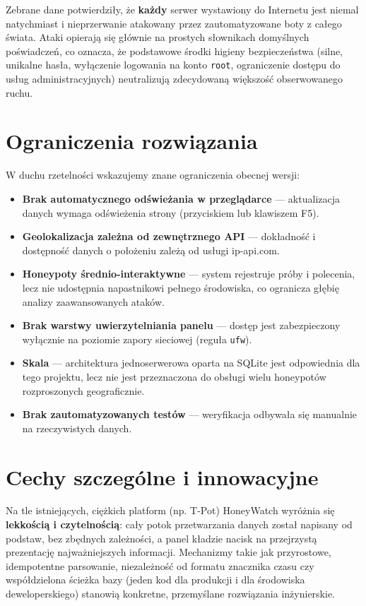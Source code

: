 \documentclass[12pt,a4paper]{report}
\begin{document}
Zebrane dane potwierdziły, że \textbf{każdy} serwer wystawiony do Internetu jest
niemal natychmiast i nieprzerwanie atakowany przez zautomatyzowane boty z całego
świata. Ataki opierają się głównie na prostych słownikach domyślnych poświadczeń,
co oznacza, że podstawowe środki higieny bezpieczeństwa (silne, unikalne hasła,
wyłączenie logowania na konto \texttt{root}, ograniczenie dostępu do usług
administracyjnych) neutralizują zdecydowaną większość obserwowanego ruchu.

\section{Ograniczenia rozwiązania}

W duchu rzetelności wskazujemy znane ograniczenia obecnej wersji:

\begin{itemize}
  \item \textbf{Brak automatycznego odświeżania w przeglądarce} --- aktualizacja
        danych wymaga odświeżenia strony (przyciskiem lub klawiszem F5).
  \item \textbf{Geolokalizacja zależna od zewnętrznego API} --- dokładność
        i dostępność danych o położeniu zależą od usługi ip-api.com.
  \item \textbf{Honeypoty średnio-interaktywne} --- system rejestruje próby
        i polecenia, lecz nie udostępnia napastnikowi pełnego środowiska, co
        ogranicza głębię analizy zaawansowanych ataków.
  \item \textbf{Brak warstwy uwierzytelniania panelu} --- dostęp jest
        zabezpieczony wyłącznie na poziomie zapory sieciowej (reguła \texttt{ufw}).
  \item \textbf{Skala} --- architektura jednoserwerowa oparta na SQLite jest
        odpowiednia dla tego projektu, lecz nie jest przeznaczona do obsługi
        wielu honeypotów rozproszonych geograficznie.
  \item \textbf{Brak zautomatyzowanych testów} --- weryfikacja odbywała się
        manualnie na rzeczywistych danych.
\end{itemize}

\section{Cechy szczególne i innowacyjne}

Na tle istniejących, ciężkich platform (np. T-Pot) HoneyWatch wyróżnia się
\textbf{lekkością i czytelnością}: cały potok przetwarzania danych został
napisany od podstaw, bez zbędnych zależności, a panel kładzie nacisk na
przejrzystą prezentację najważniejszych informacji. Mechanizmy takie jak
przyrostowe, idempotentne parsowanie, niezależność od formatu znacznika czasu
czy współdzielona ścieżka bazy (jeden kod dla produkcji i dla środowiska
deweloperskiego) stanowią konkretne, przemyślane rozwiązania inżynierskie.
\end{document}

